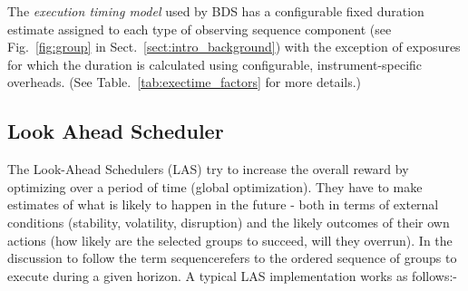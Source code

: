 The \emph{execution timing model} used by BDS has a configurable fixed duration estimate assigned to each type of observing sequence component (see Fig.~\ref{fig:group} in Sect.~\ref{sect:intro_background}) with the exception of exposures for which the duration is calculated using configurable, instrument-specific overheads. (See Table.~\ref{tab:exectime_factors} for more details.)



\subsection{Look Ahead Scheduler}


\newcommand{\echelon}{sequence}
\newcommand{\echelons}{sequences}

The Look-Ahead Schedulers (LAS) try to increase the overall reward by optimizing over a period of time (global optimization). They have to make estimates of what is likely to happen in the future - both in terms of external conditions (stability, volatility, disruption) and the likely outcomes of their own actions (how likely are the selected groups to succeed, will they overrun). In the discussion to follow the term \echelon refers to the ordered sequence of groups to execute during a given horizon. A typical LAS implementation works as follows:-

